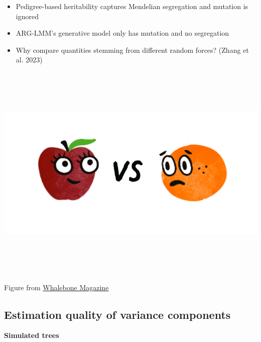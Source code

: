 \documentclass[
  letterpaper,
  DIV=11,
  numbers=noendperiod]{scrartcl}
\providecommand{\tightlist}{%
  \setlength{\itemsep}{0pt}\setlength{\parskip}{0pt}}\usepackage{longtable,booktabs,array}
\begin{document}
\begin{itemize}
\tightlist
\item
  Pedigree-based heritability captures Mendelian segregation and
  mutation is ignored
\item
  ARG-LMM's generative model only has mutation and no segregation
\item
  Why compare quantities stemming from different random forces? (Zhang
  et al. 2023)
\end{itemize}

\begin{center}
\includegraphics[width=\linewidth,height=4.16667in,keepaspectratio]{slides_files/mediabag/applesandoranges-lil.jpg}
\end{center}

Figure from \href{https://whalebonemag.com/}{Whalebone Magazine}

\subsection{Estimation quality of variance
components}\label{estimation-quality-of-variance-components}

\textbf{Simulated trees}
\end{document}
